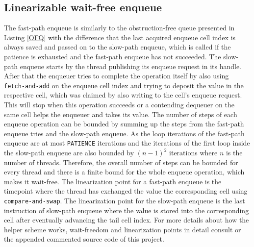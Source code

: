 \documentclass{article}
\begin{document}
\subsection{Linearizable wait-free enqueue}
The fast-path enqueue is similarly to the obstruction-free queue presented in Listing \ref{OFQ} with the difference that the last acquired enqueue cell index is always saved and passed on to the slow-path enqueue, which is called if the patience is exhausted and the fast-path enqueue has not succeeded. The slow-path enqueue starts by the thread publishing its enqueue request in its handle. After that the enqueuer tries to complete the operation itself by also using \texttt{fetch-and-add} on the enqueue cell index and trying to deposit the value in the respective cell, which was claimed by also writing to the cell's enqueue request. This will stop when this operation succeeds or a contending dequeuer on the same cell helps the enqueuer and takes its value. The number of steps of each enqueue operation can be bounded by summing up the steps from the fast-path enqueue tries and the slow-path enqueue. As the loop iterations of the fast-path enqueue are at most \texttt{PATIENCE} iterations and the iterations of the first loop inside the slow-path enqueue are also bounded by $(n - 1)^2$ iterations where $n$ is the number of threads. Therefore, the overall number of steps can be bounded for every thread and there is a finite bound for the whole enqueue operation, which makes it wait-free. The linearization point for a fast-path enqueue is the timepoint where the thread has exchanged the value the corresponding cell using \texttt{compare-and-swap}. The linearization point for the slow-path enqueue is the last instruction of slow-path enqueue where the value is stored into the corresponding cell after eventually advancing the tail cell index. For more details about how the helper scheme works, wait-freedom and linearization points in detail consult \cite{WFQ} or the appended commented source code of this project. 
\end{document}
